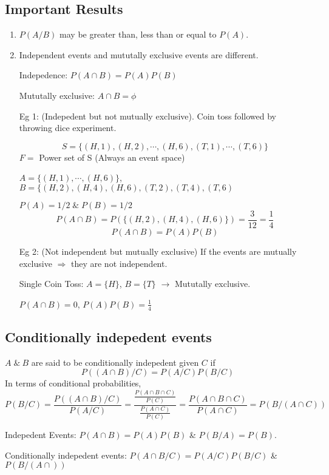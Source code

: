 \documentclass{article}
\begin{document}
\subsection{Important Results}
\begin{enumerate}
    \item $P(A/B)$ may be greater than, less than or equal to $P(A)$.
    \item Independent events and mututally exclusive events are different.

    Indepedence: $P(A \cap B)= P(A)P(B)$

    Mututally exclusive: $A \cap B = \phi$

    Eg 1: (Indepedent but not mutually exclusive). Coin toss followed by throwing dice experiment.

    $$ S=\{ (H,1), (H,2), \cdots, (H,6), (T,1), \cdots, (T,6)\}$$
    $F=$ Power set of S (Always an event space)

    $A=\{(H,1), \cdots, (H,6) \}$, $B= \{ (H,2), (H,4), (H,6), (T,2),(T,4),(T,6)$

    $P(A)= 1/2 \; \& \; P(B)= 1/2$
    $$ P(A \cap B)= P(\{ (H,2), (H,4), (H,6)\})= \frac{3}{12}= \frac{1}{4}$$
    $$ P(A\cap B)= P(A)P(B)$$

    Eg 2: (Not independent but mutually exclusive)
    If the events are mutually exclusive $\Rightarrow$ they are not independent.

    Single Coin Toss: $A= \{H \}$, $B= \{T \}$ $\rightarrow$ Mututally exclusive.

    $P(A \cap B)= 0$, $P(A)P(B)= \frac{1}{4}$

\end{enumerate}

\subsection{Conditionally indepedent events}

$A \; \& \: B$ are said to be conditionally indepedent given $C$ if
$$ P((A \cap B)/ C)= P(A/C)P(B/C)$$
In terms of conditional probabilities,
$$ P(B/C)= \frac{P((A\cap B )/ C)}{P(A/C)}= \frac{\frac{P(A \cap B \cap C)}{P(C)}}{\frac{P(A \cap C)}{P(C)}} = \frac{P(A\cap B\cap C)}{P(A \cap C)} = P(B/(A \cap C))$$

Indepedent Events: $P(A \cap B)= P(A)P(B)$ \& $P(B/A)= P(B)$.

Conditionally indepedent events: $P(A\cap B / C)= P(A/C)P(B/C)$ \& $P(B/(A\cap ))$
\end{document}
